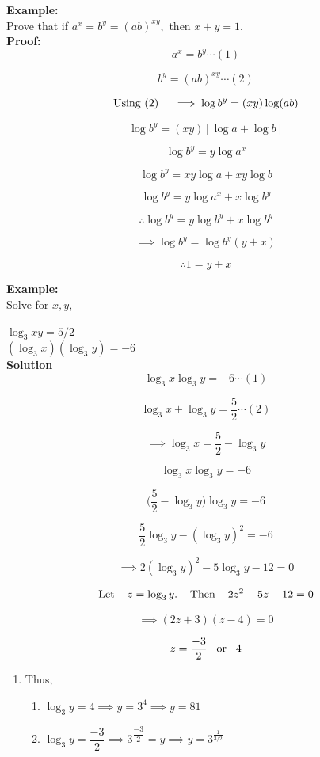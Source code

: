 \documentclass[11pt,a4paper]{article}
\begin{document}
\textbf{Example:}\\
Prove that if $a^x=b^y=(ab)^{xy},$ then $x+y=1$.\\

\textbf{Proof:}\\

$$a^x=b^y\cdots (1)$$

$$b^y=(ab)^{xy}\cdots (2)$$

$$\text{Using (2)}\hspace{0.4cm} \implies \log b^y=(xy)\log (ab)$$

$$\log b^y=(xy)[\log a + \log b]$$

$$\log b^y = y \log a^x$$

$$\log b^y = xy \log a + xy \log b$$

$$\log b^y = y\log a^x+x\log b^y$$

$$\therefore \log b^y =y\log b^y+x\log b^y$$

$$\implies \log b^y = \log b^y(y+x)$$

$$\therefore 1=y+x$$



\textbf{Example:}\\

Solve for $x,y$,

$\log_3xy=5/2$\\

$(\log_3x)(\log_3y) = -6$\\


\textbf{Solution}
$$\log_3x\log_3y=-6\cdots (1)$$

$$\log_3x+\log_3y=\frac{5}{2}\cdots (2)$$

$$\implies \log_3x=\frac{5}{2}-\log_3y$$

$$\log_3x\log_3y=-6$$

$$\bigg(\frac{5}{2}-\log_3y\bigg)\log_3y=-6$$

$$\frac{5}{2}\log_3y-(\log_3y)^2=-6$$

$$\implies 2(\log_3y)^2-5\log_3y-12=0$$

$$\text{Let}\hspace{0.4cm} z=\log_3y.\hspace{0.4cm} \text{Then}\hspace{0.4cm} 2z^2-5z-12=0$$

$$\implies (2z+3)(z-4)=0$$

$$z=\frac{-3}{2}\hspace{0.3cm}\text{or}\hspace{0.3cm}4$$

\begin{enumerate}
\item[] Thus,
\begin{enumerate}
      \item[] $\log_3y=4\implies y=3^4\implies y=81$
      
      \item[] $\log_3y=\dfrac{-3}{2}\implies 3^{\dfrac{-3}{2}}=y\implies y=3^{\frac{1}{3/2}}$\\
\end{enumerate}
\end{enumerate}
\end{document}
